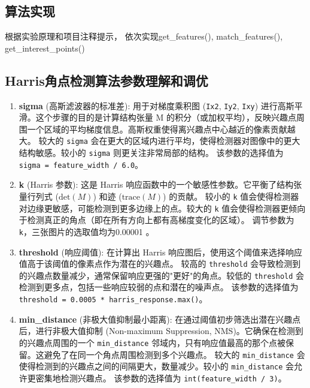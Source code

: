 \subsection{算法实现}
根据实验原理和项目注释提示，
依次实现get_features(), match_features(), get_interest_points()

\subsection{Harris角点检测算法参数理解和调优}
\begin{enumerate}
    \item \textbf{sigma} (高斯滤波器的标准差):
    用于对梯度乘积图 (\texttt{Ix2}, \texttt{Iy2}, \texttt{Ixy}) 进行高斯平滑。这个步骤的目的是计算结构张量 M 的积分（或加权平均），反映兴趣点周围一个区域的平均梯度信息。高斯权重使得离兴趣点中心越近的像素贡献越大。
    较大的 \texttt{sigma} 会在更大的区域内进行平均，使得检测器对图像中的更大结构敏感。较小的 \texttt{sigma} 则更关注非常局部的结构。
    该参数的选择值为 \texttt{sigma = feature\_width / 6.0}。


    \item \textbf{k} (Harris 参数):
    这是 Harris 响应函数中的一个敏感性参数。它平衡了结构张量行列式 (\(\text{det}(M)\)) 和迹 (\(\text{trace}(M)\)) 的贡献。
    较小的 \texttt{k} 值会使得检测器对边缘更敏感，可能检测到更多边缘上的点。较大的 \texttt{k} 值会使得检测器更倾向于检测真正的角点（即在所有方向上都有高梯度变化的区域）。
    调节参数为 \texttt{k}，三张图片的选取值均为0.00001 。


    \item \textbf{threshold} (响应阈值):
    在计算出 Harris 响应图后，使用这个阈值来选择响应值高于该阈值的像素点作为潜在的兴趣点。
    较高的 \texttt{threshold} 会导致检测到的兴趣点数量减少，通常保留响应更强的"更好"的角点。较低的 \texttt{threshold} 会检测到更多点，包括一些响应较弱的点和潜在的噪声点。
    该参数的选择值为 \texttt{threshold = 0.0005 * harris\_response.max()}。


    \item \textbf{min\_distance} (非极大值抑制最小距离):
    在通过阈值初步筛选出潜在兴趣点后，进行非极大值抑制 (Non-maximum Suppression, NMS)。它确保在检测到的兴趣点周围的一个 \texttt{min\_distance} 邻域内，只有响应值最高的那个点被保留。这避免了在同一个角点周围检测到多个兴趣点。
    较大的 \texttt{min\_distance} 会使得检测到的兴趣点之间的间隔更大，数量减少。较小的 \texttt{min\_distance} 会允许更密集地检测兴趣点。
    该参数的选择值为 \texttt{int(feature\_width / 3)}。

\end{enumerate}

